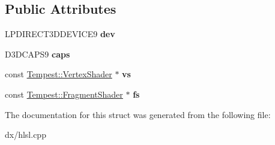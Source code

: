 \subsection*{Public Attributes}
\begin{DoxyCompactItemize}
\item 
\hypertarget{struct_h_l_s_l_1_1_data_a6bb1187a04a976d0945f5347c7ccf272}{L\+P\+D\+I\+R\+E\+C\+T3\+D\+D\+E\+V\+I\+C\+E9 {\bfseries dev}}\label{struct_h_l_s_l_1_1_data_a6bb1187a04a976d0945f5347c7ccf272}

\item 
\hypertarget{struct_h_l_s_l_1_1_data_a1907a0a6326c96ae7d17a0b343eb75fd}{D3\+D\+C\+A\+P\+S9 {\bfseries caps}}\label{struct_h_l_s_l_1_1_data_a1907a0a6326c96ae7d17a0b343eb75fd}

\item 
\hypertarget{struct_h_l_s_l_1_1_data_ae2191cd0588cf3e5c2ac1095d41aba84}{const \hyperlink{class_tempest_1_1_vertex_shader}{Tempest\+::\+Vertex\+Shader} $\ast$ {\bfseries vs}}\label{struct_h_l_s_l_1_1_data_ae2191cd0588cf3e5c2ac1095d41aba84}

\item 
\hypertarget{struct_h_l_s_l_1_1_data_a983f4a2b539af712a665834275dd86ed}{const \hyperlink{class_tempest_1_1_fragment_shader}{Tempest\+::\+Fragment\+Shader} $\ast$ {\bfseries fs}}\label{struct_h_l_s_l_1_1_data_a983f4a2b539af712a665834275dd86ed}

\end{DoxyCompactItemize}


The documentation for this struct was generated from the following file\+:\begin{DoxyCompactItemize}
\item 
dx/hlsl.\+cpp\end{DoxyCompactItemize}
